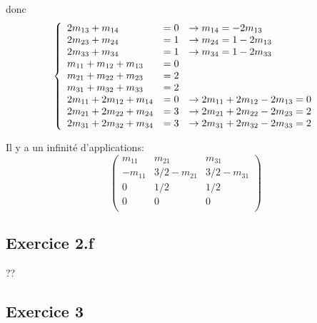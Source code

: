 \documentclass[]{book}
\theoremstyle{definition}
\begin{document}
donc
$$
\left\{
\begin{array}{l l l}
2m_{13} + m_{14} & = 0 & \to m_{14} = -2m_{13} \\
2m_{23} + m_{24} & = 1 & \to m_{24} = 1-2m_{13} \\
2m_{33} + m_{34} & = 1 & \to m_{34} = 1-2m_{33} \\
m_{11} + m_{12} + m_{13} & = 0 & \\
m_{21} + m_{22} + m_{23} & = 2 & \\
m_{31} + m_{32} + m_{33} & = 2 & \\
2m_{11} + 2m_{12} + m_{14} & = 0 & \to 2m_{11} + 2m_{12} - 2m_{13} = 0 \\
2m_{21} + 2m_{22} + m_{24} & = 3 & \to 2m_{21} + 2m_{22} - 2m_{23} = 2 \\
2m_{31} + 2m_{32} + m_{34} & = 3 & \to 2m_{31} + 2m_{32} - 2m_{33} = 2 \\
\end{array}
\right.
$$

Il y a un infinit\'e d'applications:
$$
\begin{pmatrix}
m_{11} & m_{21} & m_{31} \\
-m_{11} & 3/2-m_{21} & 3/2-m_{31} \\
0 & 1/2 & 1/2 \\
0 & 0 & 0 \\
\end{pmatrix} 
$$

\subsection*{Exercice 2.f}
??

\subsection*{Exercice 3}
\end{document}
